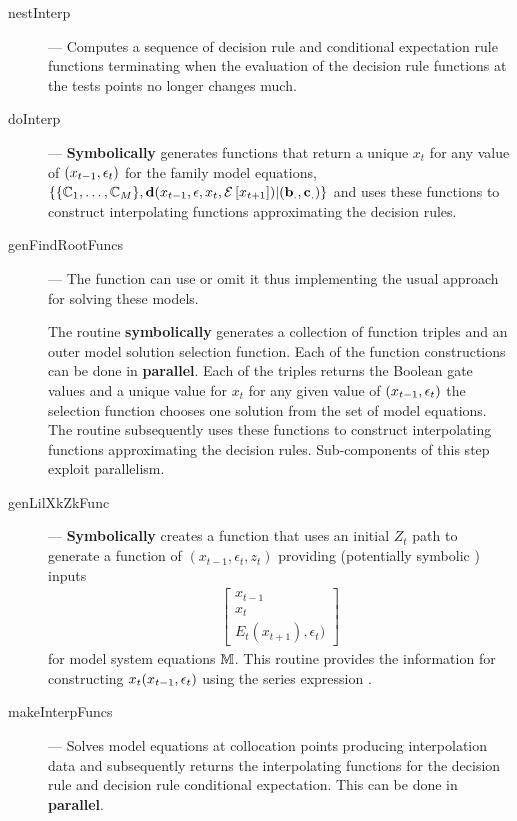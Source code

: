 \documentclass[12pt]{article}
\begin{document}
\begin{description}
\item[nestInterp] --- Computes a sequence of decision rule and conditional expectation rule functions terminating when the evaluation of the decision rule 
functions at the tests points no longer changes much.
\item[doInterp] --- {\bf Symbolically} generates functions that return a unique $x_t$ for any value of $(x_{t-1},\epsilon_t)$ for the family model equations, $\{\{\mathbb{C}_{1},\ldots,\mathbb{C}_{M}\},\mathbf{d}(x_{t-1},\epsilon,x_t,{\mathcal{E}\left [ x_{t+1} \right ]})|(\mathbf{b}_.,\mathbf{c}_.)\}$ and uses these functions to construct interpolating functions approximating the decision rules.
\item[genFindRootFuncs] --- 
The function can use  or omit it thus implementing the usual
approach for solving these models.

The routine {\bf symbolically} generates a collection of function triples
and an outer 
model solution selection function. 
Each of the function constructions can be done in {\bf parallel}.
Each of the triples
 returns the Boolean gate values and a unique value for 
$x_t$ for any given value of $(x_{t-1},\epsilon_t)$ the selection function chooses 
one solution from the set of  model equations. The routine
 subsequently uses these 
functions to construct interpolating functions approximating the 
decision rules. Sub-components of this step exploit parallelism.


\item[genLilXkZkFunc] --- {\bf Symbolically} creates a function that uses an initial $Z_t$ path to generate a function of $(x_{t-1},\epsilon_t,z_t)$ providing (potentially symbolic ) inputs 
  \begin{gather*}
    \begin{bmatrix}
x_{t-1}\\x_t\\E_t(x_{t+1}),\epsilon_t)    
    \end{bmatrix}
  \end{gather*}
 for model system equations $\mathbb{M}$.  This  routine  provides the 
information for constructing $x_t(x_{t-1},\epsilon_t)$ using the series expression .
\item[makeInterpFuncs] --- Solves model equations at collocation points 
producing interpolation data and subsequently returns the  
 interpolating functions for the decision rule and decision rule conditional expectation.  This can be done in {\bf parallel}.
\end{description}


\end{document}
